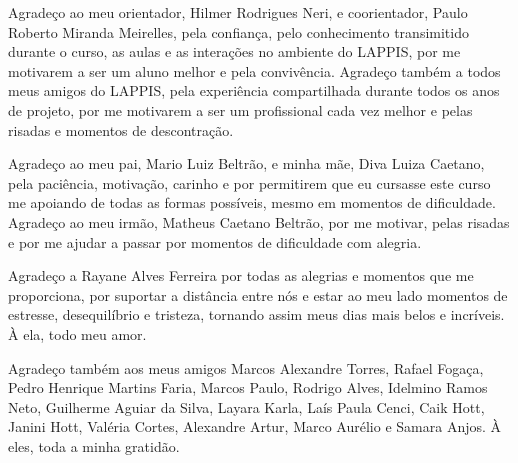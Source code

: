 \begin{agradecimentos}

Agradeço ao meu orientador, Hilmer Rodrigues Neri, e coorientador, Paulo Roberto Miranda Meirelles, pela confiança, pelo conhecimento transimitido durante o curso, as aulas e as interações no ambiente do LAPPIS, por me motivarem a ser um aluno melhor e pela convivência. Agradeço também a todos meus amigos do LAPPIS, pela experiência compartilhada durante todos os anos de projeto, por me motivarem a ser um profissional cada vez melhor e pelas risadas e momentos de descontração.

Agradeço ao meu pai, Mario Luiz Beltrão, e minha mãe, Diva Luiza Caetano, pela paciência, motivação, carinho e por permitirem que eu cursasse este curso me apoiando de todas as formas possíveis, mesmo em momentos de dificuldade. Agradeço ao meu irmão, Matheus Caetano Beltrão, por me motivar, pelas risadas e por me ajudar a passar por momentos de dificuldade com alegria.

Agradeço a Rayane Alves Ferreira por todas as alegrias e momentos que me proporciona, por suportar a distância entre nós e estar ao meu lado momentos de estresse, desequilíbrio e tristeza, tornando assim meus dias mais belos e incríveis. À ela, todo meu amor.

Agradeço também aos meus amigos Marcos Alexandre Torres, Rafael Fogaça, Pedro Henrique Martins Faria, Marcos Paulo, Rodrigo Alves, Idelmino Ramos Neto, Guilherme Aguiar da Silva, Layara Karla, Laís Paula Cenci, Caik Hott, Janini Hott, Valéria Cortes, Alexandre Artur, Marco Aurélio e Samara Anjos. À eles, toda a minha gratidão.
\end{agradecimentos}
